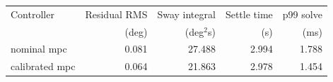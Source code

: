 \begin{tabular}{lrrrr}
\toprule
Controller & Residual RMS & Sway integral & Settle time & p99 solve \\
 & (deg) & (deg$^2$s) & (s) & (ms) \\
\midrule
nominal mpc & 0.081 & 27.488 & 2.994 & 1.788 \\
calibrated mpc & 0.064 & 21.863 & 2.978 & 1.454 \\
\bottomrule
\end{tabular}
